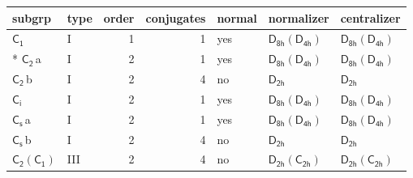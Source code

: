 \documentclass[10pt,a4paper]{article}
\numberwithin{equation}{section}
\newcommand{\grp}[1]{\mathsf{#1}}
\newcommand{\nconj}[1]{{\scriptsize$\times#1$}}
\newcommand{\clsletter}[1]{\,{\scriptsize\color{black!55}#1}}
\begin{document}
\begin{center}
\end{center}
{\small\begin{longtable}{@{}llrrlll@{}}\toprule
subgrp & type & order & conjugates & normal & normalizer & centralizer\\\midrule\endhead
\bottomrule\endfoot\endlastfoot
\href{../../../rotation/data/pdf/C1.pdf}{$\grp{C_{1}}$} & I & 1 & 1 & yes & \href{D8h-D4h.pdf}{$\grp{D_{8h}}(\grp{D_{4h}})$} & \href{D8h-D4h.pdf}{$\grp{D_{8h}}(\grp{D_{4h}})$}\\*
\href{../../../rotation/data/pdf/C2.pdf}{$\grp{C_{2}}$}\clsletter{a} & I & 2 & 1 & yes & \href{D8h-D4h.pdf}{$\grp{D_{8h}}(\grp{D_{4h}})$} & \href{D8h-D4h.pdf}{$\grp{D_{8h}}(\grp{D_{4h}})$}\\
\href{../../../rotation/data/pdf/C2.pdf}{$\grp{C_{2}}$}\clsletter{b} & I & 2 & 4 & no & \href{../../../rotation/data/pdf/D2h.pdf}{$\grp{D_{2h}}$} & \href{../../../rotation/data/pdf/D2h.pdf}{$\grp{D_{2h}}$}\\
\href{../../../rotation/data/pdf/S2.pdf}{$\grp{C_{i}}$} & I & 2 & 1 & yes & \href{D8h-D4h.pdf}{$\grp{D_{8h}}(\grp{D_{4h}})$} & \href{D8h-D4h.pdf}{$\grp{D_{8h}}(\grp{D_{4h}})$}\\
\href{../../../rotation/data/pdf/C1v.pdf}{$\grp{C_{s}}$}\clsletter{a} & I & 2 & 1 & yes & \href{D8h-D4h.pdf}{$\grp{D_{8h}}(\grp{D_{4h}})$} & \href{D8h-D4h.pdf}{$\grp{D_{8h}}(\grp{D_{4h}})$}\\
\href{../../../rotation/data/pdf/C1v.pdf}{$\grp{C_{s}}$}\clsletter{b} & I & 2 & 4 & no & \href{../../../rotation/data/pdf/D2h.pdf}{$\grp{D_{2h}}$} & \href{../../../rotation/data/pdf/D2h.pdf}{$\grp{D_{2h}}$}\\
\href{C2-C1.pdf}{$\grp{C_{2}}(\grp{C_{1}})$} & III & 2 & 4 & no & \href{D2h-C2h.pdf}{$\grp{D_{2h}}(\grp{C_{2h}})$} & \href{D2h-C2h.pdf}{$\grp{D_{2h}}(\grp{C_{2h}})$}\\

\end{longtable}}
\end{document}
